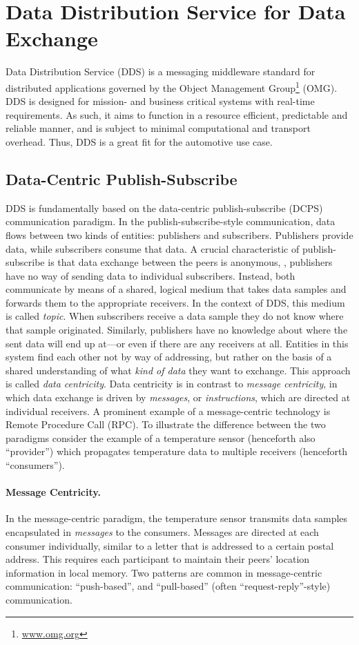 \section{Data Distribution Service for Data Exchange}
Data Distribution Service (DDS) is a messaging middleware standard \cite{dds-1.4-standard} for distributed applications governed by the Object Management Group\footnote{\url{www.omg.org}} (OMG). DDS is designed for mission- and business critical systems with real-time requirements. As such, it aims to function in a resource efficient, predictable and reliable manner, and is subject to minimal computational and transport overhead.
Thus, DDS is a great fit for the automotive use case.

\subsection{Data-Centric Publish-Subscribe}
DDS is fundamentally based on the data-centric publish-subscribe (DCPS) communication paradigm. In the publish-subscribe-style communication, data flows between two kinds of entities: publishers and subscribers. Publishers provide data, while subscribers consume that data. A crucial characteristic of publish-subscribe is that data exchange between the peers is anonymous, \ie , publishers have no way of sending data to individual subscribers. Instead, both communicate by means of a shared, logical medium that takes data samples and forwards them to the appropriate receivers. In the context of DDS, this medium is called \emph{topic}. When subscribers receive a data sample they do not know where that sample originated. Similarly, publishers have no knowledge about where the sent data will end up at---or even if there are any receivers at all. Entities in this system find each other not by way of addressing, but rather on the basis of a shared understanding of what \emph{kind of data} they want to exchange. This approach is called \emph{data centricity}. Data centricity is in contrast to \emph{message centricity}, in which data exchange is driven by \emph{messages}, or \emph{instructions}, which are directed at individual receivers. A prominent example of a message-centric technology is Remote Procedure Call (RPC). To illustrate the difference between the two paradigms consider the example of a temperature sensor (henceforth also ``provider'') which propagates temperature data to multiple receivers (henceforth ``consumers'').

\paragraph{Message Centricity.} In the message-centric paradigm, the temperature sensor transmits data samples encapsulated in \emph{messages} to the consumers. Messages are directed at each consumer individually, similar to a letter that is addressed to a certain postal address. This requires each participant to maintain their peers' location information in local memory.
Two patterns are common in message-centric communication: ``push-based'', and ``pull-based'' (often ``request-reply''-style) communication.

